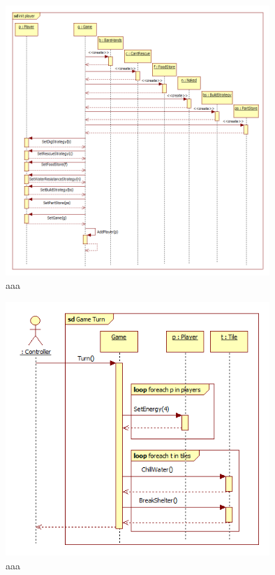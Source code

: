 \begin{figure}[H]
        \begin{center}
                \includegraphics[width=10cm]{chapters/chapter07/seqdiag/Game_init_player.png}
                \caption{aaa}
                \label{bbb}
        \end{center}
\end{figure}
\begin{figure}[H]
        \begin{center}
                \includegraphics[width=10cm]{chapters/chapter07/seqdiag/Game_Turn.png}
                \caption{aaa}
                \label{bbb}
        \end{center}
\end{figure}

